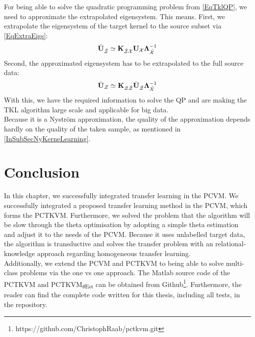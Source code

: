 For being able to solve the quadratic programming problem from \eqref{EqTklQP}, we need to approximate the extrapolated eigensystem.
This means. First, we extrapolate the eigensystem of the target kernel to the source subset via \eqref{EqExtraEigs}:
\begin{equation}
\bar{\mathbf{U}}_\mathcal{\hat{Z}}\simeq\mathbf{K}_{\mathcal{\hat{Z}X}}\mathbf{U}_{\mathcal{X}}\boldsymbol{\Lambda}_\mathcal{\hat{X}}^{-1}
\end{equation}
Second, the approximated eigensystem has to be extrapolated to the full source data:
\begin{equation}
	\bar{\mathbf{U}}_\mathcal{Z} \simeq \mathbf{K}_{\mathcal{Z\hat{Z}}}\bar{\mathbf{U}}_\mathcal{\hat{Z}}\boldsymbol{\Lambda}_\mathcal{\hat{X}}^{-1}
\end{equation}
With this, we have the required information to solve the \acl{QP} and are making the \acs{TKL} algorithm large scale and applicable for big data.\cite{Long.2015}\\
Because it is a Nyström approximation, the quality of the approximation depends hardly on the quality of the taken sample, as mentioned in \ref{InSubSecNyKerneLearning}.
\section{Conclusion}\label{InSecCon}
In this chapter, we successfully integrated transfer learning in the \acs{PCVM}.
We successfully integrated a proposed transfer learning method in the \acs{PCVM}, which forms the \acs{PCTKVM}.
Furthermore, we solved the problem that the algorithm will be slow through the theta optimisation by adopting a simple theta estimation and adjust it to the needs of the \acs{PCVM}.
Because it uses unlabelled target data, the algorithm is transductive and solves the transfer problem with an relational-knowledge approach regarding homogeneous transfer learning.\\
Additionally, we extend the \acs{PCVM} and \acs{PCTKVM} to being able to solve multi-class problems via the one vs one approach.
The Matlab source code of the \acs{PCTKVM} and \acs{PCTKVM}\textsubscript{$\theta$Est} can be obtained from Github\footnote{https://github.com/ChristophRaab/pctkvm.git}.
Furthermore, the reader can find the complete code written for this thesis, including all tests, in the repository.
